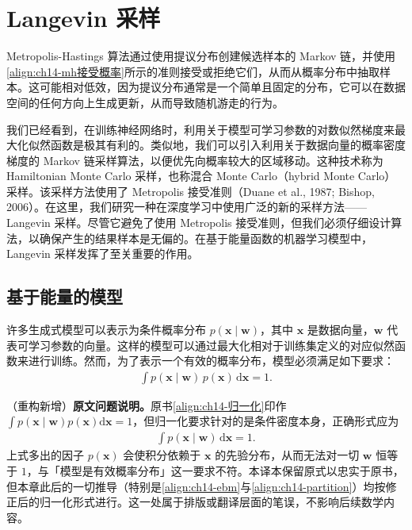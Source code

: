 \documentclass[../../main.tex]{subfiles}
\begin{document}
\section{Langevin 采样}\label{section:ch14-langevin采样}

Metropolis-Hastings 算法通过使用提议分布创建候选样本的 Markov 链，并使用\eqref{align:ch14-mh接受概率}所示的准则接受或拒绝它们，从而从概率分布中抽取样本。这可能相对低效，因为提议分布通常是一个简单且固定的分布，它可以在数据空间的任何方向上生成更新，从而导致随机游走的行为。

我们已经看到，在训练神经网络时，利用关于模型可学习参数的对数似然梯度来最大化似然函数是极其有利的。类似地，我们可以引入利用关于数据向量的概率密度梯度的 Markov 链采样算法，以便优先向概率较大的区域移动。这种技术称为 Hamiltonian Monte Carlo 采样，也称混合 Monte Carlo（hybrid Monte Carlo）采样。该采样方法使用了 Metropolis 接受准则（Duane et al., 1987; Bishop, 2006）。在这里，我们研究一种在深度学习中使用广泛的新的采样方法——Langevin 采样。尽管它避免了使用 Metropolis 接受准则，但我们必须仔细设计算法，以确保产生的结果样本是无偏的。在基于能量函数的机器学习模型中，Langevin 采样发挥了至关重要的作用。

\subsection{基于能量的模型}\label{subsection:ch14-基于能量的模型}

许多生成式模型可以表示为条件概率分布 $p(\bm{x}\mid\bm{w})$，其中 $\bm{x}$ 是数据向量，$\bm{w}$ 代表可学习参数的向量。这样的模型可以通过最大化相对于训练集定义的对应似然函数来进行训练。然而，为了表示一个有效的概率分布，模型必须满足如下要求：
\begin{align}
\int p(\bm{x}\mid\bm{w})\,p(\bm{x})\,\mathrm{d}\bm{x}=1.
\label{align:ch14-归一化}
\end{align}

\begin{remark}（重构新增）\textbf{原文问题说明。}原书\eqref{align:ch14-归一化}印作 $\int p(\bm{x}\mid\bm{w})p(\bm{x})\mathrm{d}\bm{x}=1$，但归一化要求针对的是条件密度本身，正确形式应为
\begin{align*}
\int p(\bm{x}\mid\bm{w})\,\mathrm{d}\bm{x}=1.
\end{align*}
上式多出的因子 $p(\bm{x})$ 会使积分依赖于 $\bm{x}$ 的先验分布，从而无法对一切 $\bm{w}$ 恒等于 $1$，与「模型是有效概率分布」这一要求不符。本译本保留原式以忠实于原书，但本章此后的一切推导（特别是\eqref{align:ch14-ebm}与\eqref{align:ch14-partition}）均按修正后的归一化形式进行。这一处属于排版或翻译层面的笔误，不影响后续数学内容。
\end{remark}
\end{document}
